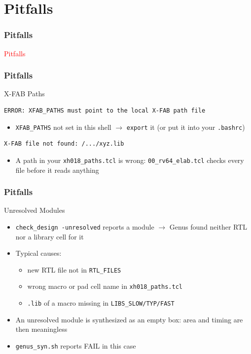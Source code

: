\documentclass{beamer}
\newcommand{\astitle}{nix}
\newcommand{\assubtitle}{nix}
\newcommand{\cmd}[1]{\texttt{#1}}
\begin{document}
\section{Pitfalls}
\renewcommand{\astitle}{Pitfalls}
\begin{frame}
\frametitle{\astitle}
\textcolor{red}{Pitfalls}
\end{frame}

\renewcommand{\assubtitle}{X-FAB Paths}
\begin{frame}[fragile]
\frametitle{\astitle}
\begin{block}{\assubtitle}
\begin{lstlisting}
ERROR: XFAB_PATHS must point to the local X-FAB path file
\end{lstlisting}
  \begin{itemize}
    \item \cmd{XFAB\_PATHS} not set in this shell $\rightarrow$ \cmd{export} it
      (or put it into your \cmd{.bashrc})
  \end{itemize}
\begin{lstlisting}
X-FAB file not found: /.../xyz.lib
\end{lstlisting}
  \begin{itemize}
    \item A path in your \cmd{xh018\_paths.tcl} is wrong: \cmd{00\_rv64\_elab.tcl}
      checks every file before it reads anything
  \end{itemize}
\end{block}
\end{frame}

\renewcommand{\assubtitle}{Unresolved Modules}
\begin{frame}
\frametitle{\astitle}
\begin{block}{\assubtitle}
  \begin{itemize}
    \item \cmd{check\_design -unresolved} reports a module $\rightarrow$
      Genus found neither RTL nor a library cell for it
    \item Typical causes:
    \begin{itemize}
      \item new RTL file not in \cmd{RTL\_FILES}
      \item wrong macro or pad cell name in \cmd{xh018\_paths.tcl}
      \item \cmd{.lib} of a macro missing in \cmd{LIBS\_SLOW/TYP/FAST}
    \end{itemize}
    \item An unresolved module is synthesized as an empty box:
      area and timing are then meaningless
    \item \cmd{genus\_syn.sh} reports FAIL in this case
  \end{itemize}
\end{block}
\end{frame}
\end{document}
